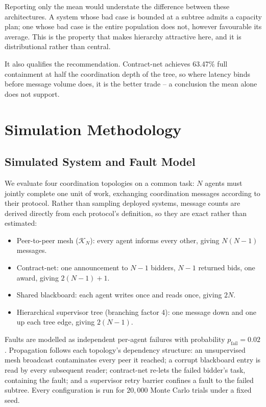 \documentclass{article}
\begin{document}
Reporting only the mean would understate the difference between these
architectures. A system whose bad case is bounded at a subtree admits a capacity
plan; one whose bad case is the entire population does not, however favourable its
average. This is the property that makes hierarchy attractive here, and it is
distributional rather than central.

It also qualifies the recommendation. Contract-net achieves
63.47\% full containment at half the
coordination depth of the tree, so where latency binds before message volume does,
it is the better trade -- a conclusion the mean alone does not support.




\section{Simulation Methodology}



\subsection{Simulated System and Fault Model}


We evaluate four coordination topologies on a common task: $N$ agents must jointly complete one unit of work, exchanging coordination messages according to their protocol. Rather than sampling deployed systems, message counts are derived directly from each protocol's definition, so they are exact rather than estimated:

\begin{itemize}
  \item Peer-to-peer mesh ($\mathcal{K}_N$): every agent informs every other, giving $N(N-1)$ messages.
  \item Contract-net: one announcement to $N-1$ bidders, $N-1$ returned bids, one award, giving $2(N-1)+1$.
  \item Shared blackboard: each agent writes once and reads once, giving $2N$.
  \item Hierarchical supervisor tree (branching factor 4): one message down and one up each tree edge, giving $2(N-1)$.
\end{itemize}

Faults are modelled as independent per-agent failures with probability $p_{\text{fail}} = 0.02$. Propagation follows each topology's dependency structure: an unsupervised mesh broadcast contaminates every peer it reached; a corrupt blackboard entry is read by every subsequent reader; contract-net re-lets the failed bidder's task, containing the fault; and a supervisor retry barrier confines a fault to the failed subtree. Every configuration is run for $20{,}000$ Monte Carlo trials under a fixed seed.
\end{document}
